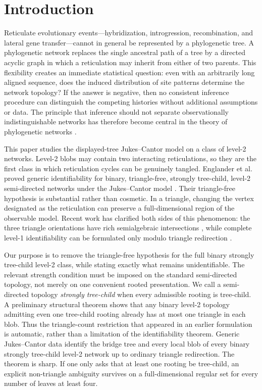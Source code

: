 \section{Introduction}

Reticulate evolutionary events---hybridization, introgression, recombination, and lateral gene transfer---cannot in general be represented by a phylogenetic tree.  A phylogenetic network replaces the single ancestral path of a tree by a directed acyclic graph in which a reticulation may inherit from either of two parents.  This flexibility creates an immediate statistical question: even with an arbitrarily long aligned sequence, does the induced distribution of site patterns determine the network topology?  If the answer is negative, then no consistent inference procedure can distinguish the competing histories without additional assumptions or data.  The principle that inference should not separate observationally indistinguishable networks has therefore become central in the theory of phylogenetic networks \cite{PardiScornavacca2015}.

This paper studies the displayed-tree Jukes--Cantor model on a class of level-2 networks.  Level-2 blobs may contain two interacting reticulations, so they are the first class in which reticulation cycles can be genuinely tangled.  Englander et al. proved generic identifiability for binary, triangle-free, strongly tree-child, level-2 semi-directed networks under the Jukes--Cantor model \cite[Theorem~3.2]{EnglanderEtAl2025}.  Their triangle-free hypothesis is substantial rather than cosmetic.  In a triangle, changing the vertex designated as the reticulation can preserve a full-dimensional region of the observable model.  Recent work has clarified both sides of this phenomenon: the three triangle orientations have rich semialgebraic intersections \cite{CurrieEtAl2026}, while complete level-1 identifiability can be formulated only modulo triangle redirection \cite[Theorem~4.9]{BritsEtAl2026}.

Our purpose is to remove the triangle-free hypothesis for the full binary strongly tree-child level-2 class, while stating exactly what remains unidentifiable.  The relevant strength condition must be imposed on the standard semi-directed topology, not merely on one convenient rooted presentation.  We call a semi-directed topology \emph{strongly tree-child} when every admissible rooting is tree-child.  A preliminary structural theorem shows that any binary level-2 topology admitting even one tree-child rooting already has at most one triangle in each blob.  Thus the triangle-count restriction that appeared in an earlier formulation is automatic, rather than a limitation of the identifiability theorem.  Generic Jukes--Cantor data identify the bridge tree and every local blob of every binary strongly tree-child level-2 network up to ordinary triangle redirection.  The theorem is sharp.  If one only asks that at least one rooting be tree-child, an explicit non-triangle ambiguity survives on a full-dimensional regular set for every number of leaves at least four.

